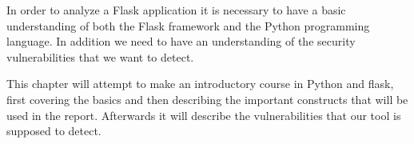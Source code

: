 In order to analyze a Flask application it is necessary to have a basic understanding of both the Flask framework and the Python programming language.
In addition we need to have an understanding of the security vulnerabilities that we want to detect.

This chapter will attempt to make an introductory course in Python and flask, first covering the basics and then describing the important constructs that will be used in the report.
Afterwards it will describe the vulnerabilities that our tool is supposed to detect.
